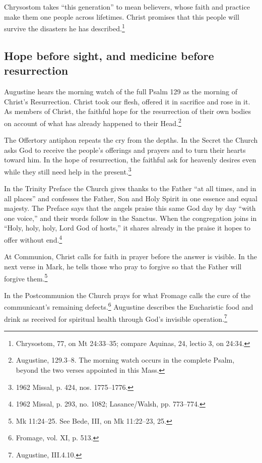 Chrysostom takes ``this generation'' to mean believers, whose faith
and practice make them one people across lifetimes. Christ promises
that this people will survive the disasters he has
described.\footnote{Chrysostom,
 77, on Mt 24:33--35; compare
Aquinas,  24, lectio 3, on 24:34.}

\subsection{Hope before sight, and medicine before resurrection}

Augustine hears the morning watch of the full Psalm 129 as the
morning of Christ's Resurrection. Christ took our flesh, offered
it in sacrifice and rose in it. As members of Christ, the faithful
hope for the resurrection of their own bodies on account of what
has already happened to their Head.\footnote{Augustine,
 129.3--8. The morning watch occurs in
the complete Psalm, beyond the two verses appointed in this Mass.}

The Offertory antiphon repeats the cry from the depths. In the Secret
the Church asks God to receive the people's offerings and prayers and
to turn their hearts toward him. In the hope of resurrection, the
faithful ask for heavenly desires even while they still need help in
the present.\footnote{1962 Missal, p. 424, nos. 1775--1776.}

In the Trinity Preface the Church gives thanks to the Father
``at all times, and in all places'' and confesses the Father,
Son and Holy Spirit in one essence and equal majesty. The
Preface says that the angels praise this same God day by day
``with one voice,'' and their words follow in the Sanctus.
When the congregation joins in ``Holy, holy, holy, Lord God
of hosts,'' it shares already in the praise it hopes to offer
without end.\footnote{1962 Missal, p. 293, no. 1082;
Lasance/Walsh, pp. 773--774.}

At Communion, Christ calls for faith in prayer before the answer is
visible. In the next verse in Mark, he tells those who pray to forgive
so that the Father will forgive them.\footnote{Mk 11:24--25. See Bede,
 III, on Mk 11:22--23, 25.}

In the Postcommunion the Church prays for what Fromage calls the cure
of the communicant's remaining defects.\footnote{Fromage, vol. XI, p. 513.}
Augustine describes the Eucharistic food and drink as received for
spiritual health through God's invisible operation.\footnote{Augustine,
 III.4.10.}

